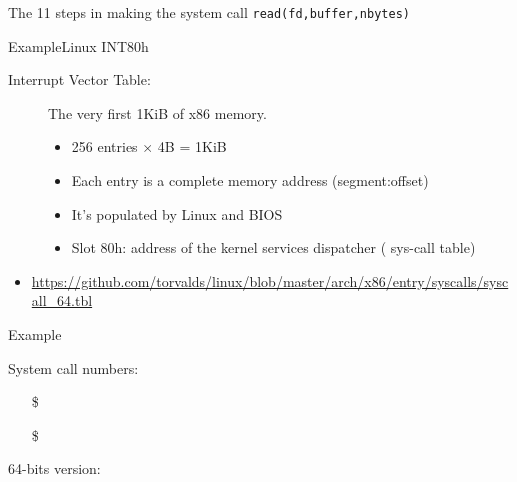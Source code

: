 \begin{frame}
  \begin{iblock}{The 11 steps in making the system call \texttt{read(fd,buffer,nbytes)}}
    \begin{center}
    \end{center}
  \end{iblock}
\end{frame}

\begin{frame}{Example}{Linux INT80h}
  \begin{description}
  \item[Interrupt Vector Table:] The very first 1KiB of x86 memory. 
    \begin{itemize} 
    \item 256 entries $\times$ 4B = 1KiB
    \item Each entry is a complete memory address (segment:offset)
    \item It's populated by Linux and BIOS
    \item Slot 80h: address of the kernel services dispatcher ({\pright} sys-call table)
    \end{itemize}
  \end{description}
\end{frame}

\begin{itemize}
\item \url{https://github.com/torvalds/linux/blob/master/arch/x86/entry/syscalls/syscall_64.tbl}
\end{itemize}

\begin{frame}{Example}
  \begin{center}
  \end{center}
  System call numbers:
  \begin{itemize}
  \item[\$] 
  \item[\$] 
  \end{itemize}
\end{frame}

64-bits version:

